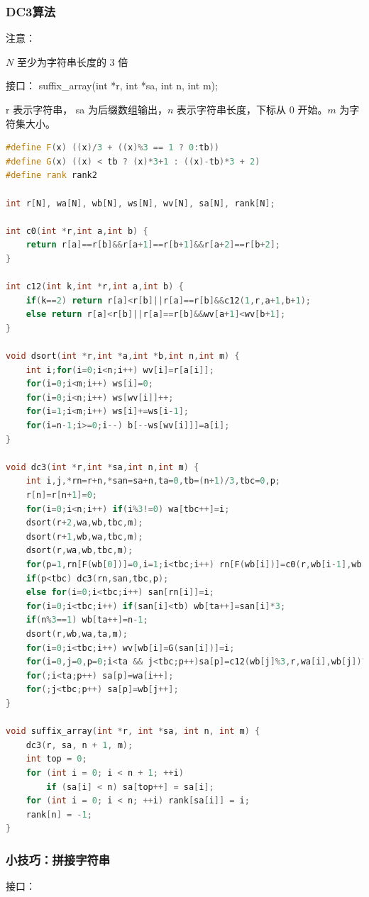 \documentclass{article}
\begin{document}
\subsubsection{DC3算法}
注意：

$N$ 至少为字符串长度的 $3$ 倍

接口： suffix\_array(int *r, int *sa, int n, int m); 

r 表示字符串， sa 为后缀数组输出，$n$ 表示字符串长度，下标从 $0$ 开始。$m$ 为字符集大小。
\begin{lstlisting}[language=C++]
#define F(x) ((x)/3 + ((x)%3 == 1 ? 0:tb))
#define G(x) ((x) < tb ? (x)*3+1 : ((x)-tb)*3 + 2)
#define rank rank2

int r[N], wa[N], wb[N], ws[N], wv[N], sa[N], rank[N];

int c0(int *r,int a,int b) {
    return r[a]==r[b]&&r[a+1]==r[b+1]&&r[a+2]==r[b+2];
}

int c12(int k,int *r,int a,int b) {
    if(k==2) return r[a]<r[b]||r[a]==r[b]&&c12(1,r,a+1,b+1);
    else return r[a]<r[b]||r[a]==r[b]&&wv[a+1]<wv[b+1];
}

void dsort(int *r,int *a,int *b,int n,int m) {
    int i;for(i=0;i<n;i++) wv[i]=r[a[i]];
    for(i=0;i<m;i++) ws[i]=0;
    for(i=0;i<n;i++) ws[wv[i]]++;
    for(i=1;i<m;i++) ws[i]+=ws[i-1];
    for(i=n-1;i>=0;i--) b[--ws[wv[i]]]=a[i];
}

void dc3(int *r,int *sa,int n,int m) {
    int i,j,*rn=r+n,*san=sa+n,ta=0,tb=(n+1)/3,tbc=0,p;
    r[n]=r[n+1]=0;
    for(i=0;i<n;i++) if(i%3!=0) wa[tbc++]=i;
    dsort(r+2,wa,wb,tbc,m);
    dsort(r+1,wb,wa,tbc,m);
    dsort(r,wa,wb,tbc,m);
    for(p=1,rn[F(wb[0])]=0,i=1;i<tbc;i++) rn[F(wb[i])]=c0(r,wb[i-1],wb[i])?p-1:p++;
    if(p<tbc) dc3(rn,san,tbc,p);
    else for(i=0;i<tbc;i++) san[rn[i]]=i;
    for(i=0;i<tbc;i++) if(san[i]<tb) wb[ta++]=san[i]*3;
    if(n%3==1) wb[ta++]=n-1;
    dsort(r,wb,wa,ta,m);
    for(i=0;i<tbc;i++) wv[wb[i]=G(san[i])]=i;
    for(i=0,j=0,p=0;i<ta && j<tbc;p++)sa[p]=c12(wb[j]%3,r,wa[i],wb[j])?wa[i++]:wb[j++];
    for(;i<ta;p++) sa[p]=wa[i++];
    for(;j<tbc;p++) sa[p]=wb[j++];
}

void suffix_array(int *r, int *sa, int n, int m) {
    dc3(r, sa, n + 1, m);
    int top = 0;
    for (int i = 0; i < n + 1; ++i)
        if (sa[i] < n) sa[top++] = sa[i];
    for (int i = 0; i < n; ++i) rank[sa[i]] = i;
    rank[n] = -1;
}
\end{lstlisting}
\subsubsection{小技巧：拼接字符串}
接口： 
\end{document}
